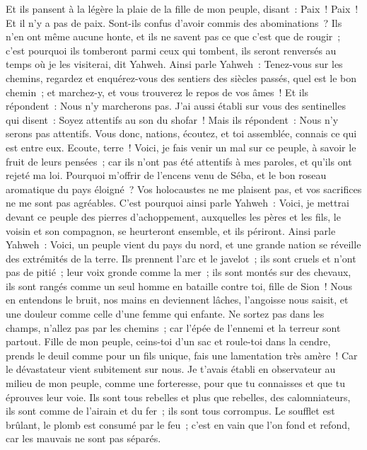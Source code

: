 \begin{multicols}{2}
Et ils pansent à la légère la plaie de la fille de mon peuple, disant~: Paix~! Paix~! Et il n'y a pas de paix.
Sont-ils confus d'avoir commis des abominations~? Ils n'en ont même aucune honte, et ils ne savent pas ce que c'est que de rougir~; c'est pourquoi ils tomberont parmi ceux qui tombent, ils seront renversés au temps où je les visiterai, dit Yahweh.
Ainsi parle Yahweh~: Tenez-vous sur les chemins, regardez et enquérez-vous des sentiers des siècles passés, quel est le bon chemin~; et marchez-y, et vous trouverez le repos de vos âmes~! Et ils répondent~: Nous n'y marcherons pas.
J'ai aussi établi sur vous des sentinelles qui disent~: Soyez attentifs au son du shofar~! Mais ils répondent~: Nous n'y serons pas attentifs.
Vous donc, nations, écoutez, et toi assemblée, connais ce qui est entre eux.
Ecoute, terre~! Voici, je fais venir un mal sur ce peuple, à savoir le fruit de leurs pensées~; car ils n'ont pas été attentifs à mes paroles, et qu'ils ont rejeté ma loi.
Pourquoi m'offrir de l'encens venu de Séba, et le bon roseau aromatique du pays éloigné~? Vos holocaustes ne me plaisent pas, et vos sacrifices ne me sont pas agréables.
C'est pourquoi ainsi parle Yahweh~: Voici, je mettrai devant ce peuple des pierres d'achoppement, auxquelles les pères et les fils, le voisin et son compagnon, se heurteront ensemble, et ils périront.
Ainsi parle Yahweh~: Voici, un peuple vient du pays du nord, et une grande nation se réveille des extrémités de la terre.
Ils prennent l'arc et le javelot~; ils sont cruels et n'ont pas de pitié~; leur voix gronde comme la mer~; ils sont montés sur des chevaux, ils sont rangés comme un seul homme en bataille contre toi, fille de Sion~!
Nous en entendons le bruit, nos mains en deviennent lâches, l'angoisse nous saisit, et une douleur comme celle d'une femme qui enfante.
Ne sortez pas dans les champs, n'allez pas par les chemins~; car l'épée de l'ennemi et la terreur sont partout.
Fille de mon peuple, ceins-toi d'un sac et roule-toi dans la cendre, prends le deuil comme pour un fils unique, fais une lamentation très amère~! Car le dévastateur vient subitement sur nous.
Je t'avais établi en observateur au milieu de mon peuple, comme une forteresse, pour que tu connaisses et que tu éprouves leur voie.
Ils sont tous rebelles et plus que rebelles, des calomniateurs, ils sont comme de l'airain et du fer~; ils sont tous corrompus.
Le soufflet est brûlant, le plomb est consumé par le feu~; c'est en vain que l'on fond et refond, car les mauvais ne sont pas séparés.

\end{multicols}
